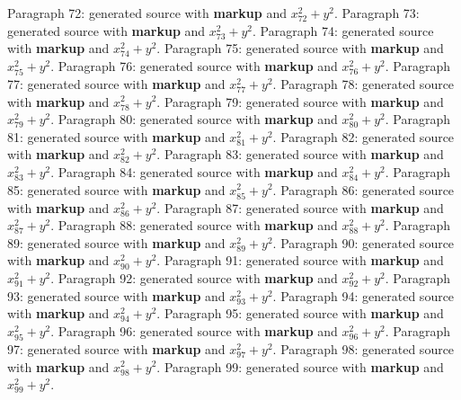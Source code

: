 \documentclass{article}
\begin{document}
Paragraph 72: generated source with \textbf{markup} and $x_{72}^2 + y^2$.
Paragraph 73: generated source with \textbf{markup} and $x_{73}^2 + y^2$.
Paragraph 74: generated source with \textbf{markup} and $x_{74}^2 + y^2$.
Paragraph 75: generated source with \textbf{markup} and $x_{75}^2 + y^2$.
Paragraph 76: generated source with \textbf{markup} and $x_{76}^2 + y^2$.
Paragraph 77: generated source with \textbf{markup} and $x_{77}^2 + y^2$.
Paragraph 78: generated source with \textbf{markup} and $x_{78}^2 + y^2$.
Paragraph 79: generated source with \textbf{markup} and $x_{79}^2 + y^2$.
Paragraph 80: generated source with \textbf{markup} and $x_{80}^2 + y^2$.
Paragraph 81: generated source with \textbf{markup} and $x_{81}^2 + y^2$.
Paragraph 82: generated source with \textbf{markup} and $x_{82}^2 + y^2$.
Paragraph 83: generated source with \textbf{markup} and $x_{83}^2 + y^2$.
Paragraph 84: generated source with \textbf{markup} and $x_{84}^2 + y^2$.
Paragraph 85: generated source with \textbf{markup} and $x_{85}^2 + y^2$.
Paragraph 86: generated source with \textbf{markup} and $x_{86}^2 + y^2$.
Paragraph 87: generated source with \textbf{markup} and $x_{87}^2 + y^2$.
Paragraph 88: generated source with \textbf{markup} and $x_{88}^2 + y^2$.
Paragraph 89: generated source with \textbf{markup} and $x_{89}^2 + y^2$.
Paragraph 90: generated source with \textbf{markup} and $x_{90}^2 + y^2$.
Paragraph 91: generated source with \textbf{markup} and $x_{91}^2 + y^2$.
Paragraph 92: generated source with \textbf{markup} and $x_{92}^2 + y^2$.
Paragraph 93: generated source with \textbf{markup} and $x_{93}^2 + y^2$.
Paragraph 94: generated source with \textbf{markup} and $x_{94}^2 + y^2$.
Paragraph 95: generated source with \textbf{markup} and $x_{95}^2 + y^2$.
Paragraph 96: generated source with \textbf{markup} and $x_{96}^2 + y^2$.
Paragraph 97: generated source with \textbf{markup} and $x_{97}^2 + y^2$.
Paragraph 98: generated source with \textbf{markup} and $x_{98}^2 + y^2$.
Paragraph 99: generated source with \textbf{markup} and $x_{99}^2 + y^2$.
\end{document}
